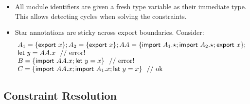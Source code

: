 \documentclass[10pt,a4paper]{article}
\newcommand\K[1]{\ensuremath{\textsf{#1}}}
\newcommand\note[1]{\noindent #1}
\begin{document}
\note{
\begin{itemize}
\item All module identifiers are given a fresh type variable as their immediate type. This allows detecting cycles when solving the constraints.
\item Star annotations are sticky across export boundaries. Consider:
$$
\begin{array}{@{}l@{}}
A_1=\{\K{export}~x\}; A_2=\{\K{export}~x\};
AA=\{\K{import}~A_1.{\star}; \K{import}~A_2.{\star}; \K{export}~x\}; \\
\K{let}~y=AA.x \mathrm{~~//~error!} \\
B=\{\K{import}~AA.x; \K{let}~y=x\} \mathrm{~~//~error!} \\
C=\{\K{import}~AA.x; \K{import}~A_1.x; \K{let}~y=x\} \mathrm{~~//~ok} \\
\end{array}
$$
\end{itemize}
}


\subsection*{Constraint Resolution}
\end{document}
